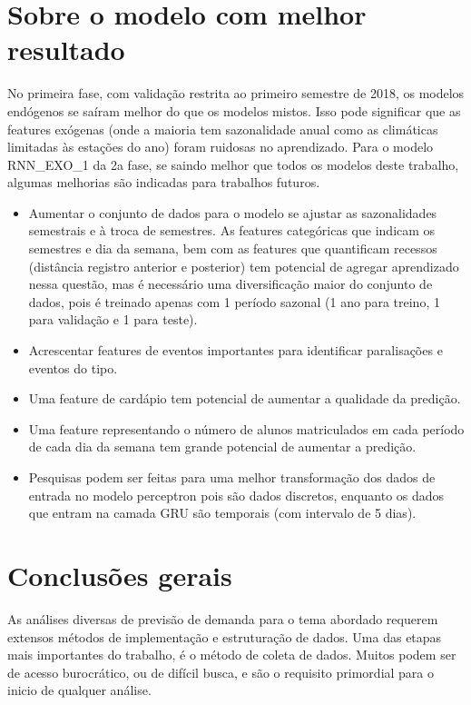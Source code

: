 \documentclass[	12pt, Times, openright, twoside, a4paper, english, brazil]{abntex2}
\begin{document}
    \section{Sobre o modelo com melhor resultado}
        No primeira fase, com validação restrita ao primeiro semestre de 2018, os modelos endógenos se saíram melhor do que os modelos mistos. Isso pode significar que as features exógenas (onde a maioria tem sazonalidade anual como as climáticas limitadas às estações do ano) foram ruidosas no aprendizado.
        Para o modelo RNN\_EXO\_1 da 2a fase, se saindo melhor que todos os modelos deste trabalho, algumas melhorias são indicadas para trabalhos futuros.\newline
        \begin{itemize}
            \item Aumentar o conjunto de dados para o modelo se ajustar as sazonalidades semestrais e à troca de semestres. As features categóricas que indicam os semestres e dia da semana, bem com as features que quantificam recessos (distância registro anterior e posterior) tem potencial de agregar aprendizado nessa questão, mas é necessário uma diversificação maior do conjunto de dados, pois é treinado apenas com 1 período sazonal (1 ano para treino, 1 para validação e 1 para teste).
            \item Acrescentar features de eventos importantes para identificar paralisações e eventos do tipo.
            \item Uma feature de cardápio tem potencial de aumentar a qualidade da predição.
            \item Uma feature representando o número de alunos matriculados em cada período de cada dia da semana tem grande potencial de aumentar a predição.
            \item Pesquisas podem ser feitas para uma melhor transformação dos dados de entrada no modelo perceptron pois são dados discretos, enquanto os dados que entram na camada GRU são temporais (com intervalo de 5 dias).
        \end{itemize}
        
    \section{Conclusões gerais}
         As análises diversas de previsão de demanda para o tema abordado requerem extensos métodos de implementação e estruturação de dados.
        Uma das etapas mais importantes do trabalho, é o método de coleta de dados. Muitos podem ser de acesso burocrático, ou de difícil busca, e são o requisito primordial para o inicio de qualquer análise.
        
\end{document}

